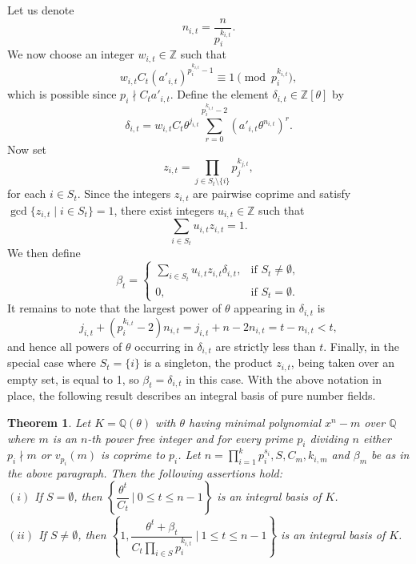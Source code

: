\documentclass[table]{amsart}
\newtheorem{theorem}{Theorem}[section]
\newcommand{\Q}{\mathbb{Q}}
\numberwithin{equation}{section}
\begin{document}
\noindent Let us denote  
\[
n_{i,t} = \frac{n}{p_i^{k_{i,t}}}.
\]  
We now choose an integer $ w_{i,t} \in \mathbb{Z} $ such that  
\[
w_{i,t} C_t (a'_{i,t})^{p_i^{k_{i,t}} - 1} \equiv 1 \pmod{p_i^{k_{i,t}}},
\]  
which is possible since $ p_i \nmid C_t a'_{i,t} $. Define the element $ \delta_{i,t} \in \mathbb{Z}[\theta] $ by  
\[
\delta_{i,t} = w_{i,t} C_t \theta^{j_{i,t}} \sum_{r = 0}^{p_i^{k_{i,t}} - 2} \left(a'_{i,t} \theta^{n_{i,t}}\right)^r.
\]  
\noindent Now set  
\[
z_{i,t} = \prod_{j \in S_t \setminus \{i\}} p_j^{k_{j,t}},
\]  
for each $ i \in S_t $. Since the integers $ z_{i,t} $ are pairwise coprime and satisfy $ \gcd\{z_{i,t} \mid i \in S_t\} = 1 $, there exist integers $ u_{i,t} \in \mathbb{Z} $ such that  
\[
\sum_{i \in S_t} u_{i,t} z_{i,t} = 1.
\]  
We then define  
\[
\beta_t =
\begin{cases}
\sum\limits_{i \in S_t} u_{i,t} z_{i,t} \delta_{i,t}, & \text{if } S_t \neq \emptyset, \\
0, & \text{if } S_t = \emptyset.
\end{cases}
\]  
\noindent It remains to note that the largest power of $ \theta $ appearing in $ \delta_{i,t} $ is  
\[
j_{i,t} + (p_i^{k_{i,t}} - 2) n_{i,t} = j_{i,t} + n - 2n_{i,t} = t - n_{i,t} < t,
\]  
and hence all powers of $ \theta $ occurring in $ \delta_{i,t} $ are strictly less than $ t $. Finally, in the special case where $ S_t = \{i\} $ is a singleton, the product $ z_{i,t} $, being taken over an empty set, is equal to 1, so $ \beta_t = \delta_{i,t} $ in this case. With the above notation in place, the following result describes an integral basis of pure number fields. 
\begin{theorem}\label{3.1} Let $K = \Q(\theta)$ with $\theta$ having minimal polynomial $x^n - m$ over $\Q$ where 
$m$ is an $n$-th power free integer and for every prime $p_i$ dividing $n$ either $p_i \nmid m$ or $v_{p_i}(m)$ is 
coprime to $p_i$. Let $n = \prod\limits_{i=1}^{k}p_i^{s_i}, S, C_m, k_{i,m}$ and $\beta_m$ be as in the 
above paragraph. Then the following assertions hold:\\
  $(i)$ If $S=\emptyset$, then $ \left\lbrace  \dfrac{\theta^t}{C_t } ~\bigg\vert~ 0\leq t\leq n-1  \right\rbrace $ is an integral basis of $K$.   \\
  $(ii)$ If $S\neq \emptyset$, then $ \left\lbrace 1,  \dfrac{\theta^t +\beta_t}{C_t \prod\limits_{i\in S} p_i ^{k_{i,t}}} ~\bigg\vert~ 1\leq t\leq n-1  \right\rbrace $ is an integral basis of $K$. 
\end{theorem}   
\end{document}
